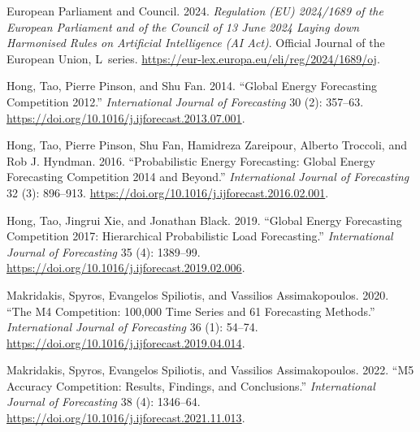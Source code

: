 \documentclass[
  english,
  letterpaper,
]{scrbook}
\newlength{\cslhangindent}
\newenvironment{CSLReferences}[2] %
 {\begin{list}{}{%
  \setlength{\itemindent}{0pt}
  \setlength{\leftmargin}{0pt}
  \setlength{\parsep}{0pt}
  \ifodd #1
   \setlength{\leftmargin}{\cslhangindent}
   \setlength{\itemindent}{-1\cslhangindent}
  \fi
  \setlength{\itemsep}{#2\baselineskip}}}
 {\end{list}}
\begin{document}
\protect{}\label{refs}
\begin{CSLReferences}{1}{1}
European Parliament and Council. 2024. \emph{Regulation ({EU}) 2024/1689
of the European Parliament and of the Council of 13 June 2024 Laying
down Harmonised Rules on Artificial Intelligence ({AI} Act)}. Official
Journal of the European Union, {L}~series.
\url{https://eur-lex.europa.eu/eli/reg/2024/1689/oj}.

Hong, Tao, Pierre Pinson, and Shu Fan. 2014. {``Global Energy
Forecasting Competition 2012.''} \emph{International Journal of
Forecasting} 30 (2): 357--63.
\url{https://doi.org/10.1016/j.ijforecast.2013.07.001}.

Hong, Tao, Pierre Pinson, Shu Fan, Hamidreza Zareipour, Alberto
Troccoli, and Rob J. Hyndman. 2016. {``Probabilistic Energy Forecasting:
Global Energy Forecasting Competition 2014 and Beyond.''}
\emph{International Journal of Forecasting} 32 (3): 896--913.
\url{https://doi.org/10.1016/j.ijforecast.2016.02.001}.

Hong, Tao, Jingrui Xie, and Jonathan Black. 2019. {``Global Energy
Forecasting Competition 2017: Hierarchical Probabilistic Load
Forecasting.''} \emph{International Journal of Forecasting} 35 (4):
1389--99. \url{https://doi.org/10.1016/j.ijforecast.2019.02.006}.

Makridakis, Spyros, Evangelos Spiliotis, and Vassilios Assimakopoulos.
2020. {``The {M4} Competition: 100{,}000 Time Series and 61 Forecasting
Methods.''} \emph{International Journal of Forecasting} 36 (1): 54--74.
\url{https://doi.org/10.1016/j.ijforecast.2019.04.014}.

Makridakis, Spyros, Evangelos Spiliotis, and Vassilios Assimakopoulos.
2022. {``{M5} Accuracy Competition: Results, Findings, and
Conclusions.''} \emph{International Journal of Forecasting} 38 (4):
1346--64. \url{https://doi.org/10.1016/j.ijforecast.2021.11.013}.

\end{CSLReferences}


\backmatter
\end{document}
